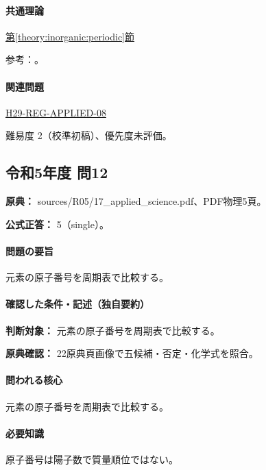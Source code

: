 \paragraph{共通理論} \hyperref[theory:inorganic:periodic]{第\ref*{theory:inorganic:periodic}節}

\par 参考：\cite{atomic_nist2019}。

\paragraph{関連問題} \hyperref[q:h29-reg-applied-08]{H29-REG-APPLIED-08}

\par 難易度 2（校準初稿）、優先度未評価。

\subsection{令和5年度 問12}
\label{q:r05-reg-applied-12}

\noindent\textbf{原典：} sources/R05/17\_applied\_science.pdf、PDF物理5頁。

\textbf{公式正答：} 5（single）。

\paragraph{問題の要旨} 元素の原子番号を周期表で比較する。

\paragraph{確認した条件・記述（独自要約）}\mbox{}\par

\noindent\textbf{判断対象：} 元素の原子番号を周期表で比較する。\par

\noindent\textbf{原典確認：} 22原典頁画像で五候補・否定・化学式を照合。\par

\paragraph{問われる核心} 元素の原子番号を周期表で比較する。

\paragraph{必要知識} 原子番号は陽子数で質量順位ではない。

